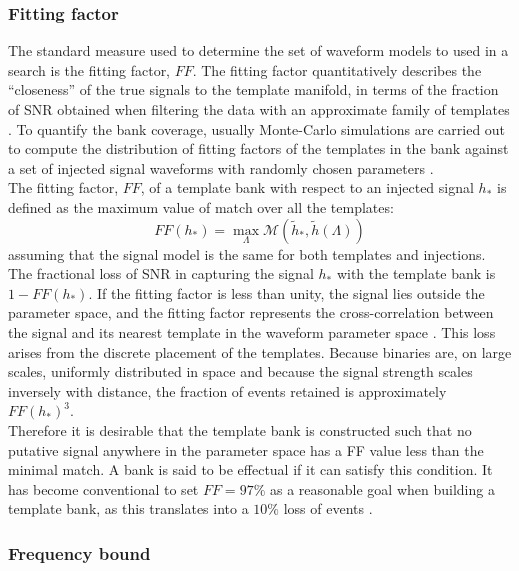 \documentclass[binding=0.6cm, LaM]{sapthesis}
\begin{document}
\subsubsection{Fitting factor}

	The standard measure used to determine the set of waveform models to used in a
        search is the fitting factor, $FF$.
	The fitting factor quantitatively describes the ``closeness'' of 
	the true signals to the template manifold, in terms of the fraction of 
	SNR obtained when filtering 
	the data with an approximate family of templates \cite{31}. 
	To quantify the bank coverage, usually Monte-Carlo simulations are carried out   
	to compute the distribution of fitting factors of the templates in the bank against 
	a set of injected signal waveforms with randomly chosen parameters \cite{32}. \\
	The fitting factor, $FF$, of a template bank with respect to an injected signal $h_{*}$ 
	is defined as the maximum value of match over all the templates:
		\begin{equation}
			FF(h_{*}) = \max_\Lambda \mathcal{M}(\tilde{h}_{*}, \tilde{h}(\Lambda))
		\end{equation}
	assuming that the signal model is the same for both templates and injections. 
	The fractional loss of SNR in capturing the signal 
	$h_{*}$ with the template bank is $1 - FF(h_{*})$.
	If the fitting factor is less than unity, the signal lies outside the parameter space, 
	and the fitting factor represents the cross-correlation between 
	the signal and its nearest template in the waveform parameter space \cite{33}. 
	This loss arises from the discrete placement of the templates. 
	Because binaries are, on large scales, uniformly distributed in space 
	and because the signal strength scales inversely with distance, 
	the fraction of events retained is approximately $FF(h_*)^3$. \\ 
	Therefore it is desirable that the template bank is constructed such that 
	no putative signal anywhere in the parameter space
	has a FF value less than the minimal match. 
	A bank is said to be effectual if it can satisfy this condition.
	It has become conventional to set $FF = 97\%$ as a reasonable goal when building a template bank, 
	as this translates into a $10\%$ loss of events \cite{33}.

\subsubsection{Frequency bound}
\end{document}
